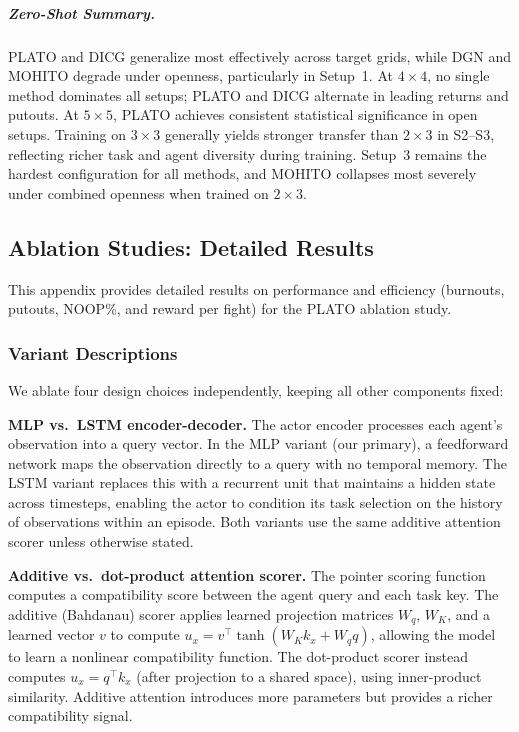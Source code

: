 \subparagraph{Zero-Shot Summary.}
PLATO and DICG generalize most effectively across target grids, while DGN and MOHITO degrade under openness, particularly in Setup~1. At $4\times 4$, no single method dominates all setups; PLATO and DICG alternate in leading returns and putouts. At $5\times 5$, PLATO achieves consistent statistical significance in open setups. Training on $3\times 3$ generally yields stronger transfer than $2\times 3$ in S2--S3, reflecting richer task and agent diversity during training. Setup~3 remains the hardest configuration for all methods, and MOHITO collapses most severely under combined openness when trained on $2\times 3$.

\subsection{Ablation Studies: Detailed Results}\label{sec:ablation_appendix}

This appendix provides detailed results on performance and efficiency (burnouts, putouts, NOOP\%, and reward per fight) for the PLATO ablation study.

\subsubsection{Variant Descriptions}
We ablate four design choices independently, keeping all other components fixed:

\textbf{MLP vs.\ LSTM encoder-decoder.} The actor encoder processes each agent's observation into a query vector. In the MLP variant (our primary), a feedforward network maps the observation directly to a query with no temporal memory. The LSTM variant replaces this with a recurrent unit that maintains a hidden state across timesteps, enabling the actor to condition its task selection on the history of observations within an episode. Both variants use the same additive attention scorer unless otherwise stated.

\textbf{Additive vs.\ dot-product attention scorer.} The pointer scoring function computes a compatibility score between the agent query and each task key. The additive (Bahdanau) scorer applies learned projection matrices $W_q$, $W_K$, and a learned vector $v$ to compute $u_x = v^\top \tanh(W_K k_x + W_q q)$, allowing the model to learn a nonlinear compatibility function. The dot-product scorer instead computes $u_x = q^\top k_x$ (after projection to a shared space), using inner-product similarity. Additive attention introduces more parameters but provides a richer compatibility signal.

